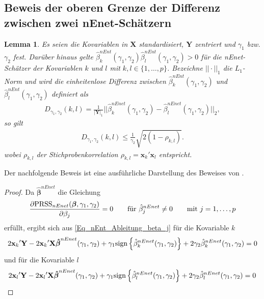 \documentclass[12pt, a4paper]{report}\usepackage[]{graphicx}\usepackage[]{color}
\newtheorem{lemma}{Lemma}
\begin{document}
\begin{appendix}
\section{Beweis der oberen Grenze der Differenz zwischen zwei nEnet-Schätzern}\label{App_obere_Grenze_Diff_nEnet}
\begin{lemma}
Es seien die Kovariablen in $\mathbf{X}$ standardisiert, $\mathbf{Y}$ zentriert und $\gamma_1$ bzw. $\gamma_2$ fest. Darüber hinaus gelte $\hat{\beta}^{nEnt}_k(\gamma_1,\gamma_2) \hat{\beta}^{nEnt}_l(\gamma_1,\gamma_2) >0$ für die nEnet-Schätzer der Kovariablen $k$ und $l$ mit $k,l \in \{1,\dots,p\}$. Bezeichne $||\cdot||_1$ die $L_1$-Norm und wird die einheitenlose Differenz zwischen $\hat{\beta}^{nEnt}_k(\gamma_1,\gamma_2)$ und $\hat{\beta}^{nEnt}_l(\gamma_1,\gamma_2)$ definiert als
\begin{align*}
D_{\gamma_1,\gamma_2}(k,l)=\frac{1}{|\mathbf{Y}|_1}||\hat{\beta}_k^{nEnet}(\gamma_1,\gamma_2)-\hat{\beta}_l^{nEnet}(\gamma_1,\gamma_2)||_2,
\end{align*}
so gilt
\begin{align*}
D_{\gamma_1,\gamma_2}(k,l) \leq \frac{1}{\gamma_2}\sqrt{2(1-\rho_{k,l})}.
\end{align*}
wobei $\rho_{k,l}$ der Stichprobenkorrelation $\rho_{k,l}=\mathbf{x}_k{'}\mathbf{x}_l$ entspricht.
\end{lemma}
Der nachfolgende Beweis ist eine ausführliche Darstellung des Beweises von .
\begin{proof}
Da $\boldsymbol{\hat{\beta}}^{nEnet}$ die Gleichung
\begin{align}\label{Eq_nEnt_Ableitung_beta_j}
\frac{\partial\textnormal{PRSS}_{nEnet}(\boldsymbol{\beta},\gamma_1,\gamma_2)}{\partial \beta_j}=0 \qquad \textnormal{für} \ \hat{\beta}^{nEnet}_j \neq 0 \qquad \textnormal{mit} \ j=1,\dots,p
\end{align}
erfüllt, ergibt sich aus \eqref{Eq_nEnt_Ableitung_beta_j} für die Kovariable $k$
\begin{align}\label{Eq_Diff_nEnet_Kovariable_K}
2\mathbf{x}_k{'}\mathbf{Y}-2\mathbf{x}_k{'}\mathbf{X}\boldsymbol{\hat{\beta}}^{nEnet}(\gamma_1,\gamma_2) + \gamma_1 \textnormal{sign}\left\lbrace\hat{\beta}_k^{nEnet}(\gamma_1,\gamma_2)\right\rbrace + 2\gamma_2\hat{\beta}_k^{nEnet}(\gamma_1,\gamma_2)=0
\end{align}
und für die Kovariable $l$
\begin{align}\label{Eq_Diff_nEnet_Kovariable_L}
2\mathbf{x}_l{'}\mathbf{Y}-2\mathbf{x}_l{'}\mathbf{X}\boldsymbol{\hat{\beta}}^{nEnet}(\gamma_1,\gamma_2) + \gamma_1 \textnormal{sign}\left\lbrace\hat{\beta}_l^{nEnet}(\gamma_1,\gamma_2)\right\rbrace + 2\gamma_2\hat{\beta}_l^{nEnet}(\gamma_1,\gamma_2)=0

\end{align}
\end{proof}
\end{appendix}
\end{document}
